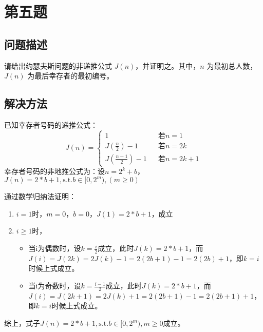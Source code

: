 \documentclass[cs4size, punct, nospace, fancyhdr, fntef, UTF8]{ctexart}
\begin{document}
  \section{第五题}
  \subsection{问题描述}
  请给出约瑟夫斯问题的非递推公式 $J\left(n\right)$，并证明之。其中，$n$ 为最初总人数，$J\left(n\right)$ 为最后幸存者的最初编号。
  \subsection{解决方法}
  已知幸存者号码的递推公式：
  \begin{equation}\label{equ5_1}
    J(n)=\left\{
      \begin{array}{lcl}
        {1}                       &      & {若n=1}\\
        {J(\frac{n}{2})-1}        &      & {若n=2k}\\
        {J(\frac{n-1}{2})-1}      &      & {若n=2k+1}
      \end{array} \right.
  \end{equation}
  幸存者号码的非地推公式为：设$n=2^k+b$，$J(n)=2*b+1, \mathrm{s.t.}b\in [0,2^m), (m \geq 0)$

  通过数学归纳法证明：
  \begin{enumerate}
    \item $i=1$时，$m=0$，$b=0$，$J(1)=2*b+1$，成立
    \item $i \ge 1$时，
    \begin{itemize}
      \item 当i为偶数时，设$k=\frac{i}{2}$成立，此时$J(k) = 2*b+1$，而$J(i)=J(2k) = 2J(k)-1 = 2(2b+1)-1 = 2(2b) + 1$，即$k = i$时候上式成立。
      \item 当i为奇数时，设$k=\frac{i-1}{2}$成立，此时$J(k) = 2*b+1$，而$J(i)=J(2k+1) = 2J(k)+1 = 2(2b+1)-1 = 2(2b+1) + 1$，即$k = i$时候上式成立。
    \end{itemize}
  \end{enumerate}
  综上，式子$J(n)=2*b+1, \mathrm{s.t.}b\in [0,2^m), m \geq 0$成立。
\end{document}
